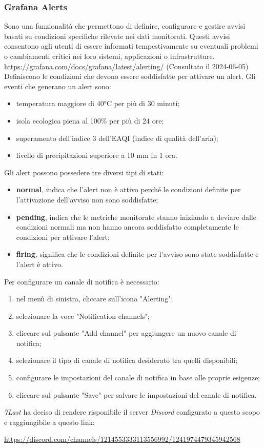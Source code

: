 \subsubsection{Grafana Alerts}
Sono una funzionalità che permettono di definire, configurare e gestire avvisi basati su condizioni specifiche rilevate nei dati monitorati. Questi avvisi consentono agli utenti di essere informati tempestivamente su eventuali problemi o cambiamenti critici nei loro sistemi, applicazioni o infrastrutture.
\url{https://grafana.com/docs/grafana/latest/alerting/} (Consultato il 2024-06-05)
Definiscono le condizioni che devono essere soddisfatte per attivare un alert. Gli eventi che generano un alert sono:
\begin{itemize}
    \item temperatura maggiore di 40°C per più di 30 minuti;
    \item isola ecologica piena al 100\% per più di 24 ore;
    \item superamento dell'indice 3 dell'EAQI (indice di qualità dell'aria);
    \item livello di precipitazioni superiore a 10 mm in 1 ora.
\end{itemize}
Gli alert possono possedere tre diversi tipi di stati:
\begin{itemize}
    \item \textbf{normal}, indica che l'alert non è attivo perché le condizioni definite per l'attivazione dell'avviso non sono soddisfatte;
    \item \textbf{pending}, indica che le metriche monitorate stanno iniziando a deviare dalle condizioni normali ma non hanno ancora soddisfatto completamente le condizioni per attivare l'alert;
    \item \textbf{firing}, significa che le condizioni definite per l'avviso sono state soddisfatte e l'alert è attivo.
\end{itemize}
Per configurare un canale di notifica è necessario:
\begin{enumerate}
    \item nel menù di sinistra, cliccare sull'icona "Alerting";
    \item selezionare la voce "Notification channels";  
    \item cliccare sul pulsante "Add channel" per aggiungere un nuovo canale di notifica;
    \item selezionare il tipo di canale di notifica desiderato tra quelli disponibili;
    \item configurare le impostazioni del canale di notifica in base alle proprie esigenze;
    \item cliccare sul pulsante "Save" per salvare le impostazioni del canale di notifica.
\end{enumerate}
\textit{7Last} ha deciso di rendere risponibile il server \textit{Discord} configurato a questo scopo e raggiungibile a questo link:
\begin{center}
    \url{https://discord.com/channels/1214553333113556992/1241974479345942568}
\end{center}
